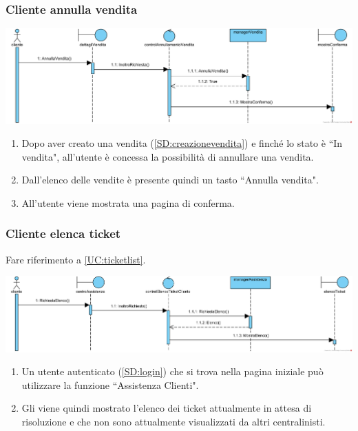 \documentclass[12pt]{article}
\begin{document}
\subsubsection{Cliente annulla vendita}
\label{SD:annullavendita}

\begin{center}
\includegraphics[width=\textwidth]{SequenceDiagram/ClienteVenditaAnnulla}
\end{center}

\begin{enumerate}
\item Dopo aver creato una vendita (\ref{SD:creazionevendita}) e finché lo stato è ``In vendita", all'utente è concessa la possibilità di annullare una vendita.
\item Dall'elenco delle vendite è presente quindi un tasto ``Annulla vendita".
\item All'utente viene mostrata una pagina di conferma.
\end{enumerate}

\newpage

\subsubsection{Cliente elenca ticket}
\label{SD:elencoticket}
Fare riferimento a \ref{UC:ticketlist}. \\

\begin{center}
\includegraphics[width=\textwidth]{SequenceDiagram/ClienteTicketElenco}
\end{center}

\begin{enumerate}
\item Un utente autenticato (\ref{SD:login}) che si trova nella pagina iniziale può utilizzare la funzione ``Assistenza Clienti".
\item Gli viene quindi mostrato l'elenco dei ticket attualmente in attesa di risoluzione e che non sono attualmente visualizzati da altri centralinisti.
\end{enumerate}
\end{document}
